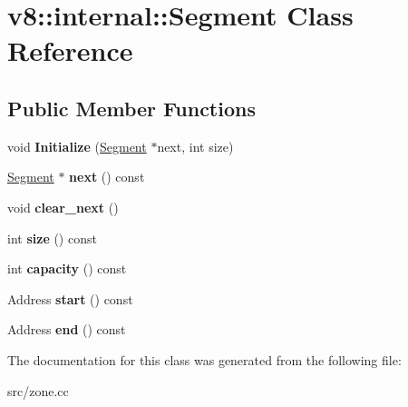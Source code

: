 \hypertarget{classv8_1_1internal_1_1_segment}{}\section{v8\+:\+:internal\+:\+:Segment Class Reference}
\label{classv8_1_1internal_1_1_segment}
\subsection*{Public Member Functions}
\begin{DoxyCompactItemize}
\item 
\hypertarget{classv8_1_1internal_1_1_segment_aba2cf8563dce2ec5b7abc08e669bca78}{}void {\bfseries Initialize} (\hyperlink{classv8_1_1internal_1_1_segment}{Segment} $\ast$next, int size)\label{classv8_1_1internal_1_1_segment_aba2cf8563dce2ec5b7abc08e669bca78}

\item 
\hypertarget{classv8_1_1internal_1_1_segment_a0aefcd7c631b87c17b8428d10bc408ab}{}\hyperlink{classv8_1_1internal_1_1_segment}{Segment} $\ast$ {\bfseries next} () const \label{classv8_1_1internal_1_1_segment_a0aefcd7c631b87c17b8428d10bc408ab}

\item 
\hypertarget{classv8_1_1internal_1_1_segment_a63bf9c645acafb2b921ba3c5e8ac9213}{}void {\bfseries clear\+\_\+next} ()\label{classv8_1_1internal_1_1_segment_a63bf9c645acafb2b921ba3c5e8ac9213}

\item 
\hypertarget{classv8_1_1internal_1_1_segment_ab0b7e665fe5c46aff9fa28fbabc4d13c}{}int {\bfseries size} () const \label{classv8_1_1internal_1_1_segment_ab0b7e665fe5c46aff9fa28fbabc4d13c}

\item 
\hypertarget{classv8_1_1internal_1_1_segment_a869341690e3012d5f16ac78ebbc88e46}{}int {\bfseries capacity} () const \label{classv8_1_1internal_1_1_segment_a869341690e3012d5f16ac78ebbc88e46}

\item 
\hypertarget{classv8_1_1internal_1_1_segment_abbaaa544cff0d9869cab5fbc3bf0e803}{}Address {\bfseries start} () const \label{classv8_1_1internal_1_1_segment_abbaaa544cff0d9869cab5fbc3bf0e803}

\item 
\hypertarget{classv8_1_1internal_1_1_segment_ae3d423ce6c83233af0f81b80fd5f226a}{}Address {\bfseries end} () const \label{classv8_1_1internal_1_1_segment_ae3d423ce6c83233af0f81b80fd5f226a}

\end{DoxyCompactItemize}


The documentation for this class was generated from the following file\+:\begin{DoxyCompactItemize}
\item 
src/zone.\+cc\end{DoxyCompactItemize}
